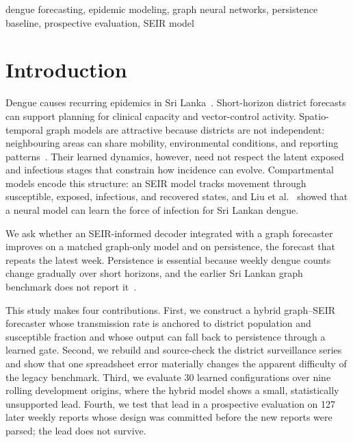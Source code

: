 \documentclass[conference]{IEEEtran}
\begin{document}
\begin{IEEEkeywords}
dengue forecasting, epidemic modeling, graph neural networks, persistence baseline, prospective evaluation, SEIR model
\end{IEEEkeywords}

\section{Introduction}
Dengue causes recurring epidemics in Sri Lanka~\cite{tissera2020severe}.
Short-horizon district forecasts can support planning for clinical capacity and vector-control activity.
Spatio-temporal graph models are attractive because districts are not independent: neighbouring areas can share mobility, environmental conditions, and reporting patterns~\cite{weng2024graph}.
Their learned dynamics, however, need not respect the latent exposed and infectious stages that constrain how incidence can evolve.
Compartmental models encode this structure: an SEIR model tracks movement through susceptible, exposed, infectious, and recovered states, and Liu et al.~\cite{liu2025seirlstm} showed that a neural model can learn the force of infection for Sri Lankan dengue.

We ask whether an SEIR-informed decoder integrated with a graph forecaster improves on a matched graph-only model and on persistence, the forecast that repeats the latest week.
Persistence is essential because weekly dengue counts change gradually over short horizons, and the earlier Sri Lankan graph benchmark does not report it~\cite{weng2024graph}.

This study makes four contributions.
First, we construct a hybrid graph--SEIR forecaster whose transmission rate is anchored to district population and susceptible fraction and whose output can fall back to persistence through a learned gate.
Second, we rebuild and source-check the district surveillance series and show that one spreadsheet error materially changes the apparent difficulty of the legacy benchmark.
Third, we evaluate 30 learned configurations over nine rolling development origins, where the hybrid model shows a small, statistically unsupported lead.
Fourth, we test that lead in a prospective evaluation on 127 later weekly reports whose design was committed before the new reports were parsed; the lead does not survive.
\end{document}
